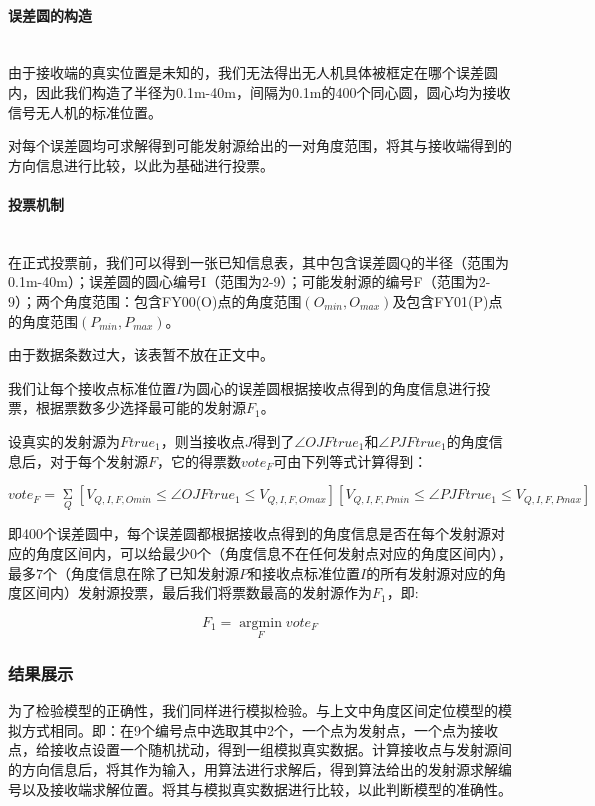 \documentclass{ctexart}
\newcommand{\subsubsubsection}[1]{\paragraph{#1}\mbox{}\\}
\begin{document}
  \subsubsubsection{误差圆的构造}

  由于接收端的真实位置是未知的，我们无法得出无人机具体被框定在哪个误差圆内，因此我们构造了半径为0.1m-40m，间隔为0.1m的400个同心圆，圆心均为接收信号无人机的标准位置。

  对每个误差圆均可求解得到可能发射源给出的一对角度范围，将其与接收端得到的方向信息进行比较，以此为基础进行投票。

  \subsubsubsection{投票机制}

  在正式投票前，我们可以得到一张已知信息表，其中包含误差圆Q的半径（范围为0.1m-40m）；误差圆的圆心编号I（范围为2-9）；可能发射源的编号F（范围为2-9）；两个角度范围：包含FY00(O)点的角度范围$(O_{min},O_{max})$及包含FY01(P)点的角度范围$(P_{min},P_{max})$。

  由于数据条数过大，该表暂不放在正文中。

  我们让每个接收点标准位置$I$为圆心的误差圆根据接收点得到的角度信息进行投票，根据票数多少选择最可能的发射源$F_1$。

  设真实的发射源为$Ftrue_1$，则当接收点$J$得到了$\angle OJFtrue_1$和$\angle PJFtrue_1$的角度信息后，对于每个发射源$F$，它的得票数$vote_F$可由下列等式计算得到：

  \begin{equation}
  vote_F=\mathop{\Sigma}\limits_{Q} [V_{Q,I,F,Omin} \le \angle OJFtrue_1 \le V_{Q,I,F,Omax}][V_{Q,I,F,Pmin} \le \angle PJFtrue_1 \le V_{Q,I,F,Pmax}]
\end{equation}


  即400个误差圆中，每个误差圆都根据接收点得到的角度信息是否在每个发射源对应的角度区间内，可以给最少$0$个（角度信息不在任何发射点对应的角度区间内），最多$7$个（角度信息在除了已知发射源$P$和接收点标准位置$I$的所有发射源对应的角度区间内）发射源投票，最后我们将票数最高的发射源作为$F_1$，即:

  \begin{equation}
F_1=\mathop{\arg\min}\limits_{F} vote_F
\end{equation}




  \subsubsection{结果展示}

  为了检验模型的正确性，我们同样进行模拟检验。与上文中角度区间定位模型的模拟方式相同。即：在9个编号点中选取其中2个，一个点为发射点，一个点为接收点，给接收点设置一个随机扰动，得到一组模拟真实数据。计算接收点与发射源间的方向信息后，将其作为输入，用算法进行求解后，得到算法给出的发射源求解编号以及接收端求解位置。将其与模拟真实数据进行比较，以此判断模型的准确性。
\end{document}
